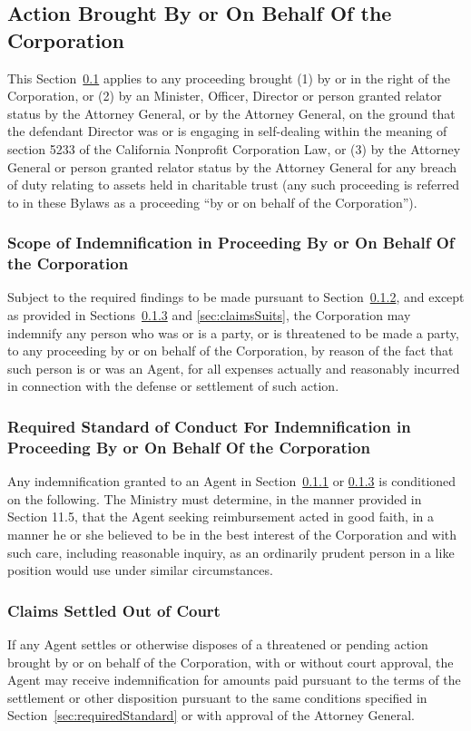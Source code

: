 \documentclass[letterpaper,titlepage]{article}
\begin{document}
\subsection{Action Brought By or On Behalf Of the Corporation}
\label{sec:actionBrought}
This Section~\ref{sec:actionBrought} applies to any proceeding brought (1) by
or in the right of the Corporation, or (2) by an Minister, Officer, Director or
person granted relator status by the Attorney General, or by the Attorney
General, on the ground that the defendant Director was or is engaging in
self-dealing within the meaning of section 5233 of the California Nonprofit
Corporation Law, or (3) by the Attorney General or person granted relator status by the Attorney General for any breach of duty relating to assets held in charitable trust (any such proceeding is referred to in these Bylaws as a proceeding “by or on behalf of the Corporation”). 
\subsubsection{Scope of Indemnification in Proceeding By or On Behalf Of the Corporation}
\label{sec:scopeIndemnificationProceeding}
Subject to the required findings to be made pursuant to
Section~\ref{sec:requiredStandardBy}, and except as provided in
Sections~\ref{sec:claimsSettled} and \ref{sec:claimsSuits}, the Corporation may indemnify any person who was or is a party, or is threatened to be made a party, to any proceeding by or on behalf of the Corporation, by reason of the fact that such person is or was an Agent, for all expenses actually and reasonably incurred in connection with the defense or settlement of such action. 
\subsubsection{Required Standard of Conduct For Indemnification in Proceeding By or On Behalf Of the Corporation}
\label{sec:requiredStandardBy}
Any indemnification granted to an Agent in
Section~\ref{sec:scopeIndemnificationProceeding} or \ref{sec:claimsSettled} is conditioned on the following. The Ministry must determine, in the manner provided in Section 11.5, that the Agent seeking reimbursement acted in good faith, in a manner he or she believed to be in the best interest of the Corporation and with such care, including reasonable inquiry, as an ordinarily prudent person in a like position would use under similar circumstances. 
\subsubsection{Claims Settled Out of Court}
\label{sec:claimsSettled}
If any Agent settles or otherwise disposes of a threatened or pending action
brought by or on behalf of the Corporation, with or without court approval, the
Agent may receive indemnification for amounts paid pursuant to the terms of the
settlement or other disposition pursuant to the same conditions specified in
Section~\ref{sec:requiredStandard} or with approval of the Attorney General. 
\end{document}
